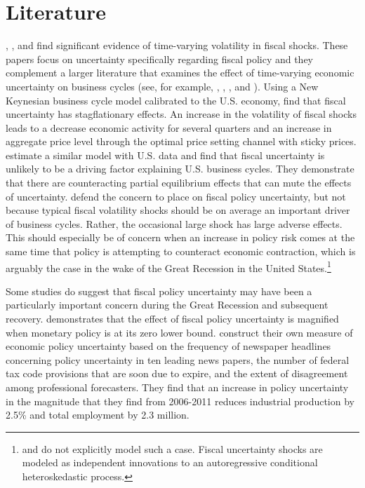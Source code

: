 \documentclass[11pt]{article}
\newcommand{\citee}[1]{\citet{#1}}
\begin{document}
\section{Literature}

\citee{fvetal2011}, \citee{born2011}, and \citee{johannsen2012} find significant evidence of time-varying volatility in fiscal shocks.  These papers focus on uncertainty specifically regarding fiscal policy and they complement a larger literature that examines the effect of time-varying economic uncertainty on business cycles (see, for example, \citee{justprim2008}, \citee{bloom2009}, \citee{fvetal2011aer}, and \citee{bloom_uncertainbus}).  Using a New Keynesian business cycle model calibrated to the U.S. economy, \citee{fvetal2011} find that fiscal uncertainty has stagflationary effects.  An increase in the volatility of fiscal shocks leads to a decrease economic activity for several quarters and an increase in aggregate price level through the optimal price setting channel with sticky prices.  \citee{born2011} estimate a similar model with U.S. data and find that fiscal uncertainty is unlikely to be a driving factor explaining U.S. business cycles.  They demonstrate that there are counteracting partial equilibrium effects that can mute the effects of uncertainty.  \citee{fvetal2011} defend the concern to place on fiscal policy uncertainty, but not because typical fiscal volatility shocks should be on average an important driver of business cycles.  Rather, the occasional large shock has large adverse effects.  This should especially be of concern when an increase in policy risk comes at the same time that policy is attempting to counteract economic contraction, which is arguably the case in the wake of the Great Recession in the United States.\footnote{\citee{fvetal2011} and \citee{born2011} do not explicitly model such a case.  Fiscal uncertainty shocks are modeled as independent innovations to an autoregressive conditional heteroskedastic process.}  

Some studies do suggest that fiscal policy uncertainty may have been a particularly important concern during the Great Recession and subsequent recovery.  \citee{johannsen2012} demonstrates that the effect of fiscal policy uncertainty is magnified when monetary policy is at its zero lower bound.  \citee{baker2013} construct their own measure of economic policy uncertainty based on the frequency of newspaper headlines concerning policy uncertainty in ten leading news papers, the number of federal tax code provisions that are soon due to expire, and the extent of disagreement among professional forecasters.  They find that an increase in policy uncertainty in the magnitude that they find from 2006-2011 reduces industrial production by 2.5\% and total employment by 2.3 million.
\end{document}
